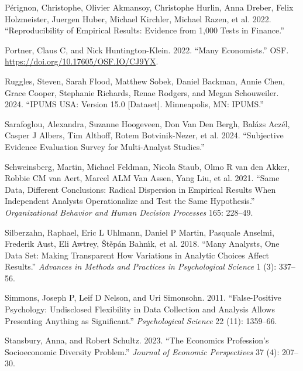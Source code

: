 \documentclass[
  letterpaper,
  DIV=11,
  numbers=noendperiod]{scrartcl}
\newlength{\cslhangindent}
\newenvironment{CSLReferences}[2] %
 {\begin{list}{}{%
  \setlength{\itemindent}{0pt}
  \setlength{\leftmargin}{0pt}
  \setlength{\parsep}{0pt}
  \ifodd #1
   \setlength{\leftmargin}{\cslhangindent}
   \setlength{\itemindent}{-1\cslhangindent}
  \fi
  \setlength{\itemsep}{#2\baselineskip}}}
 {\end{list}}
\begin{document}
\begin{CSLReferences}{1}{0}
Pérignon, Christophe, Olivier Akmansoy, Christophe Hurlin, Anna Dreber,
Felix Holzmeister, Juergen Huber, Michael Kirchler, Michael Razen, et
al. 2022. {``Reproducibility of Empirical Results: Evidence from 1,000
Tests in Finance.''}

Portner, Claus C, and Nick Huntington-Klein. 2022. {``Many
Economists.''} OSF. \url{https://doi.org/10.17605/OSF.IO/CJ9YX}.

Ruggles, Steven, Sarah Flood, Matthew Sobek, Daniel Backman, Annie Chen,
Grace Cooper, Stephanie Richards, Renae Rodgers, and Megan Schouweiler.
2024. {``IPUMS USA: Version 15.0 {[}Dataset{]}. Minneapolis, MN:
IPUMS.''}

Sarafoglou, Alexandra, Suzanne Hoogeveen, Don Van Den Bergh, Balázs
Aczél, Casper J Albers, Tim Althoff, Rotem Botvinik-Nezer, et al. 2024.
{``Subjective Evidence Evaluation Survey for Multi-Analyst Studies.''}

Schweinsberg, Martin, Michael Feldman, Nicola Staub, Olmo R van den
Akker, Robbie CM van Aert, Marcel ALM Van Assen, Yang Liu, et al. 2021.
{``Same Data, Different Conclusions: Radical Dispersion in Empirical
Results When Independent Analysts Operationalize and Test the Same
Hypothesis.''} \emph{Organizational Behavior and Human Decision
Processes} 165: 228--49.

Silberzahn, Raphael, Eric L Uhlmann, Daniel P Martin, Pasquale Anselmi,
Frederik Aust, Eli Awtrey, Štěpán Bahnı́k, et al. 2018. {``Many Analysts,
One Data Set: Making Transparent How Variations in Analytic Choices
Affect Results.''} \emph{Advances in Methods and Practices in
Psychological Science} 1 (3): 337--56.

Simmons, Joseph P, Leif D Nelson, and Uri Simonsohn. 2011.
{``False-Positive Psychology: Undisclosed Flexibility in Data Collection
and Analysis Allows Presenting Anything as Significant.''}
\emph{Psychological Science} 22 (11): 1359--66.

Stansbury, Anna, and Robert Schultz. 2023. {``The Economics Profession's
Socioeconomic Diversity Problem.''} \emph{Journal of Economic
Perspectives} 37 (4): 207--30.


\end{CSLReferences}
\end{document}
